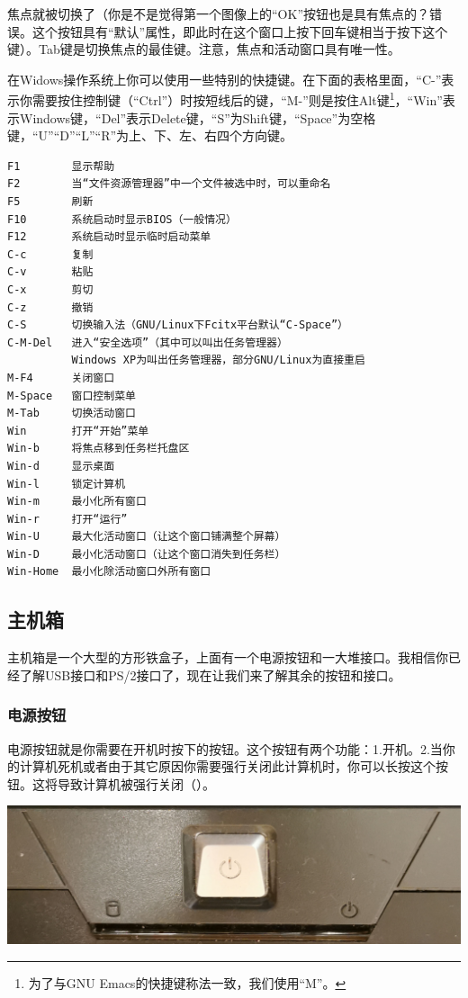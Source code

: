 焦点就被切换了（你是不是觉得第一个图像上的“OK”按钮也是具有焦点的？错误。这个按钮具有“默认”属性，即此时在这个窗口上按下回车键相当于按下这个键）。Tab键是切换焦点的最佳键。注意，焦点和活动窗口具有唯一性。\par
在Widows操作系统上你可以使用一些特别的快捷键。在下面的表格里面，“C-”表示你需要按住控制键（“Ctrl”）时按短线后的键，“M-”则是按住Alt键\footnote{为了与GNU Emacs的快捷键称法一致，我们使用“M”。}，“Win”表示Windows键，“Del”表示Delete键，“S”为Shift键，“Space”为空格键，“U”“D”“L”“R”为上、下、左、右四个方向键。
\begin{verbatim}
F1        显示帮助
F2        当“文件资源管理器”中一个文件被选中时，可以重命名
F5        刷新
F10       系统启动时显示BIOS（一般情况）
F12       系统启动时显示临时启动菜单
C-c       复制
C-v       粘贴
C-x       剪切
C-z       撤销
C-S       切换输入法（GNU/Linux下Fcitx平台默认“C-Space”）
C-M-Del   进入“安全选项”（其中可以叫出任务管理器）
          Windows XP为叫出任务管理器，部分GNU/Linux为直接重启
M-F4      关闭窗口
M-Space   窗口控制菜单
M-Tab     切换活动窗口
Win       打开“开始”菜单
Win-b     将焦点移到任务栏托盘区
Win-d     显示桌面
Win-l     锁定计算机
Win-m     最小化所有窗口
Win-r     打开“运行”
Win-U     最大化活动窗口（让这个窗口铺满整个屏幕）
Win-D     最小化活动窗口（让这个窗口消失到任务栏）
Win-Home  最小化除活动窗口外所有窗口
\end{verbatim}
\subsection{主机箱}
主机箱是一个大型的方形铁盒子，上面有一个电源按钮和一大堆接口。我相信你已经了解USB接口和PS/2接口了，现在让我们来了解其余的按钮和接口。
\subsubsection{电源按钮}
电源按钮就是你需要在开机时按下的按钮。这个按钮有两个功能：1.开机。2.当你的计算机死机或者由于其它原因你需要强行关闭此计算机时，你可以长按这个按钮。这将导致计算机被强行关闭（{\color{red}{警告！正常情况下不要尝试使用这种方法关闭计算机——这有可能导致严重的数据丢失！你只能在死机并且等得不耐烦时使用！}}）。
\begin{center}
	\includegraphics[scale=0.12]{pic/StB}
\end{center}\par
